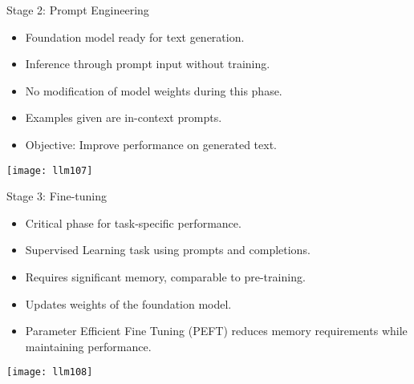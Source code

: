 \begin{frame}[fragile]{Stage 2: Prompt Engineering}
    \begin{itemize}
        \item Foundation model ready for text generation.
        \item Inference through prompt input without training.
        \item No modification of model weights during this phase.
        \item Examples given are in-context prompts.
        \item Objective: Improve performance on generated text.
    \end{itemize}
	
		\begin{center}
		\texttt{[image: llm107]}
		\end{center}	
\end{frame}

\begin{frame}[fragile]{Stage 3: Fine-tuning}
    \begin{itemize}
        \item Critical phase for task-specific performance.
        \item Supervised Learning task using prompts and completions.
        \item Requires significant memory, comparable to pre-training.
        \item Updates weights of the foundation model.
        \item Parameter Efficient Fine Tuning (PEFT) reduces memory requirements while maintaining performance.
    \end{itemize}
	
		\begin{center}
		\texttt{[image: llm108]}
		\end{center}	
\end{frame}


